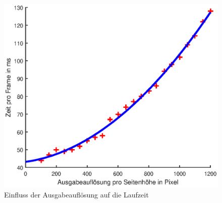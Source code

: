 \begin{figure}[!htb]
	\centering
	\includegraphics[width=\textwidth]{images/runningTimePerSlantheight.eps}
	\caption{Einfluss der Ausgabeauflösung auf die Laufzeit}
	\label{fig:influenceRes2}
\end{figure}
























